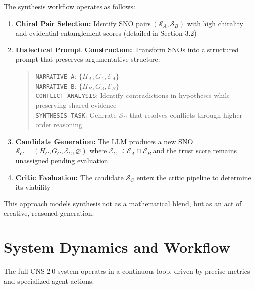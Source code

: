 \documentclass[12pt, a4paper]{article}
\begin{document}
The synthesis workflow operates as follows:
\begin{enumerate}
    \item \textbf{Chiral Pair Selection:} Identify SNO pairs $(\mathcal{S}_A, \mathcal{S}_B)$ with high chirality and evidential entanglement scores (detailed in Section 3.2)
    
    \item \textbf{Dialectical Prompt Construction:} Transform SNOs into a structured prompt that preserves argumentative structure:
        \begin{quote}
        \texttt{NARRATIVE\_A}: $\{H_A, G_A, \mathcal{E}_A\}$ \\
        \texttt{NARRATIVE\_B}: $\{H_B, G_B, \mathcal{E}_B\}$ \\
        \texttt{CONFLICT\_ANALYSIS}: Identify contradictions in hypotheses while preserving shared evidence \\
        \texttt{SYNTHESIS\_TASK}: Generate $\mathcal{S}_C$ that resolves conflicts through higher-order reasoning
        \end{quote}
    
    \item \textbf{Candidate Generation:} The LLM produces a new SNO $\mathcal{S}_C = (H_C, G_C, \mathcal{E}_C, \varnothing)$ where $\mathcal{E}_C \supseteq \mathcal{E}_A \cap \mathcal{E}_B$ and the trust score remains unassigned pending evaluation
    
    \item \textbf{Critic Evaluation:} The candidate $\mathcal{S}_C$ enters the critic pipeline to determine its viability
\end{enumerate}
This approach models synthesis not as a mathematical blend, but as an act of creative, reasoned generation.

\section{System Dynamics and Workflow}
The full CNS 2.0 system operates in a continuous loop, driven by precise metrics and specialized agent actions.
\end{document}
